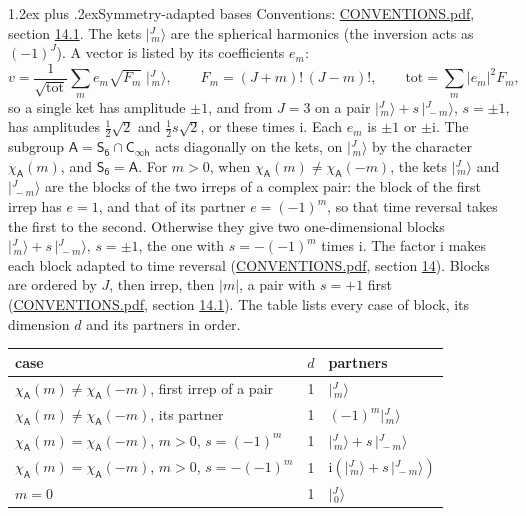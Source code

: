 \documentclass[10pt,a4paper]{article}
\makeatletter
\renewcommand\section{\@startsection{section}{1}{\z@}{-3ex plus -1ex minus -.2ex}%
  {1.2ex plus .2ex}{\normalfont\large\sffamily\bfseries\color{parttitle}}}
\numberwithin{equation}{section}
\newcommand{\grp}[1]{\mathsf{#1}}
\newcommand{\iunit}{\mathrm{i}}
\newcommand{\chiA}{\chi_{\grp{A}}}
\newcommand{\jm}[2]{\bigl\lvert{}^{#1}_{\,#2}\bigr\rangle}
\makeatother
\begin{document}
\section{Symmetry-adapted bases}\label{s:bases}
Conventions: \href{../../CONVENTIONS.pdf}{CONVENTIONS.pdf}, section \href{../../CONVENTIONS.pdf\#conv.14.1}{14.1}.
\leavevmode\label{n:index.m}\label{n:vector.ket}The kets $\jm{J}{m}$ are the spherical harmonics (the inversion acts as $(-1)^J$). \label{n:index.ketcoefficient}\label{n:vector.basis.symmetry}\label{n:index.ketweight}\label{n:index.total}A vector is listed by its coefficients $e_m$:
\begin{equation}\label{e:ket}v = \frac{1}{\sqrt{\mathrm{tot}}}\sum_m e_m\sqrt{F_m}\;\jm{J}{m},\qquad F_m = (J+m)!\,(J-m)!,\qquad \mathrm{tot} = \sum_m |e_m|^2F_m,\end{equation}
\leavevmode\label{n:index.pair.sign}so a single ket has amplitude $\pm1$, and from $J = 3$ on a pair $\jm{J}{m} + s\,\jm{J}{-m}$, $s = \pm1$, has amplitudes $\tfrac{1}{2}\sqrt{2}$ and $\tfrac{1}{2}s\sqrt{2}$, or these times $\iunit$. Each $e_m$ is $\pm1$ or $\pm\iunit$.
\leavevmode\label{n:group.A}\label{n:function.character.abelian}The subgroup $\grp{A} = \grp{S_{6}}\cap\grp{C_{\infty h}}$ acts diagonally on the kets, on $\jm{J}{m}$ by the character $\chiA(m)$, and $\grp{S_{6}} = \grp{A}$. For $m > 0$, when $\chiA(m) \ne \chiA(-m)$, the kets $\jm{J}{m}$ and $\jm{J}{-m}$ are the blocks of the two irreps of a complex pair: the block of the first irrep has $e = 1$, and that of its partner $e = (-1)^m$, so that time reversal takes the first to the second. Otherwise they give two one-dimensional blocks $\jm{J}{m} + s\,\jm{J}{-m}$, $s = \pm1$, the one with $s = -(-1)^m$ times $\iunit$. The factor $\iunit$ makes each block adapted to time reversal (\href{../../CONVENTIONS.pdf}{CONVENTIONS.pdf}, section \href{../../CONVENTIONS.pdf\#conv.14}{14}). Blocks are ordered by $J$, then irrep, then $|m|$, a pair with $s = +1$ first (\href{../../CONVENTIONS.pdf}{CONVENTIONS.pdf}, section \href{../../CONVENTIONS.pdf\#conv.14.1}{14.1}).
\leavevmode\label{n:head.case}\label{n:head.partners}The table lists every case of block, its dimension $d$ and its partners in order.
\begin{center}\begin{tabular}{@{}lrl@{}}\toprule
case & $d$ & partners\\\midrule
$\chiA(m) \ne \chiA(-m)$, first irrep of a pair & 1 & $\jm{J}{m}$\\
$\chiA(m) \ne \chiA(-m)$, its partner & 1 & $(-1)^m\jm{J}{m}$\\
$\chiA(m) = \chiA(-m)$, $m > 0$, $s = (-1)^m$ & 1 & $\jm{J}{m} + s\,\jm{J}{-m}$\\
$\chiA(m) = \chiA(-m)$, $m > 0$, $s = -(-1)^m$ & 1 & $\iunit(\jm{J}{m} + s\,\jm{J}{-m})$\\
$m = 0$ & 1 & $\jm{J}{0}$\\
\bottomrule\end{tabular}\end{center}
\end{document}
